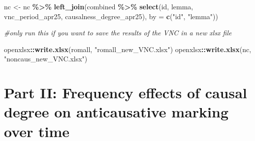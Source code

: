 \documentclass[
]{article}
\newenvironment{Shaded}{\begin{snugshade}}{\end{snugshade}}
\newcommand{\AttributeTok}[1]{\textcolor[rgb]{0.13,0.29,0.53}{#1}}
\newcommand{\CommentTok}[1]{\textcolor[rgb]{0.56,0.35,0.01}{\textit{#1}}}
\newcommand{\FunctionTok}[1]{\textcolor[rgb]{0.13,0.29,0.53}{\textbf{#1}}}
\newcommand{\NormalTok}[1]{#1}
\newcommand{\OtherTok}[1]{\textcolor[rgb]{0.56,0.35,0.01}{#1}}
\newcommand{\SpecialCharTok}[1]{\textcolor[rgb]{0.81,0.36,0.00}{\textbf{#1}}}
\newcommand{\StringTok}[1]{\textcolor[rgb]{0.31,0.60,0.02}{#1}}
\begin{document}
\begin{Shaded}
\begin{Highlighting}[]
\NormalTok{nc }\OtherTok{\textless{}{-}}\NormalTok{ nc }\SpecialCharTok{\%\textgreater{}\%}
  \FunctionTok{left\_join}\NormalTok{(combined }\SpecialCharTok{\%\textgreater{}\%} \FunctionTok{select}\NormalTok{(id, lemma, vnc\_period\_apr25, causalness\_degree\_apr25),}
            \AttributeTok{by =} \FunctionTok{c}\NormalTok{(}\StringTok{"id"}\NormalTok{, }\StringTok{"lemma"}\NormalTok{))}
\end{Highlighting}
\end{Shaded}

\begin{Shaded}
\begin{Highlighting}[]
\CommentTok{\#only run this if you want to save the results of the VNC in a new xlsx file}

\NormalTok{openxlsx}\SpecialCharTok{::}\FunctionTok{write.xlsx}\NormalTok{(romall, }\StringTok{"romall\_new\_VNC.xlsx"}\NormalTok{)}
\NormalTok{openxlsx}\SpecialCharTok{::}\FunctionTok{write.xlsx}\NormalTok{(nc, }\StringTok{"noncaus\_new\_VNC.xlsx"}\NormalTok{)}
\end{Highlighting}
\end{Shaded}

\section{Part II: Frequency effects of causal degree on anticausative
marking over
time}\label{part-ii-frequency-effects-of-causal-degree-on-anticausative-marking-over-time}
\end{document}
